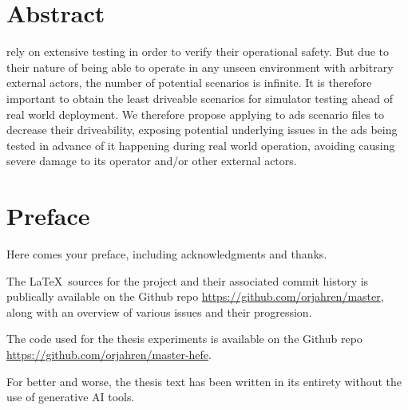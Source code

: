 \chapter*{Abstract}

 rely on extensive testing in order to verify their operational safety. But due to
their nature of being able to operate in any unseen environment with arbitrary external actors,
the number of potential scenarios is infinite. It is therefore important to obtain the least
driveable scenarios for simulator testing ahead of real world deployment. We therefore propose
applying  to \acrlong{ads} scenario files to decrease their driveability, exposing
potential underlying issues in the \acrshort{ads} being tested in advance of it happening during
real world operation, avoiding causing severe damage to its operator and/or other external actors.

\chapter*{Preface}
Here comes your preface, including acknowledgments and thanks.

The \LaTeX~sources for the project and their associated commit history is publically available on
the Github repo \url{https://github.com/orjahren/master}, along with an overview of various issues
and their progression.

The code used for the thesis experiments is available on the Github repo \url{https://github.com/orjahren/master-hefe}.

For better and worse, the thesis text has been written in its entirety without the use of generative
AI tools.